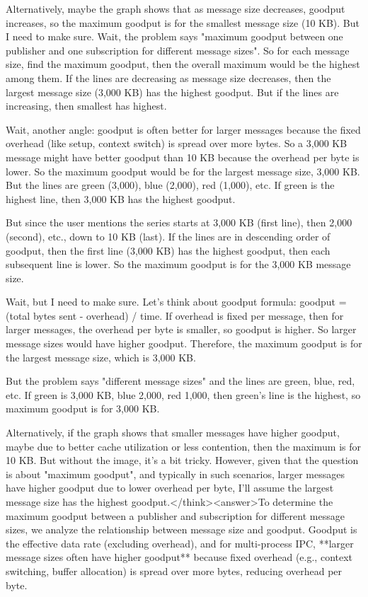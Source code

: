 Alternatively, maybe the graph shows that as message size decreases, goodput increases, so the maximum goodput is for the smallest message size (10 KB). But I need to make sure. Wait, the problem says "maximum goodput between one publisher and one subscription for different message sizes". So for each message size, find the maximum goodput, then the overall maximum would be the highest among them. If the lines are decreasing as message size decreases, then the largest message size (3,000 KB) has the highest goodput. But if the lines are increasing, then smallest has highest. 

Wait, another angle: goodput is often better for larger messages because the fixed overhead (like setup, context switch) is spread over more bytes. So a 3,000 KB message might have better goodput than 10 KB because the overhead per byte is lower. So the maximum goodput would be for the largest message size, 3,000 KB. But the lines are green (3,000), blue (2,000), red (1,000), etc. If green is the highest line, then 3,000 KB has the highest goodput. 

But since the user mentions the series starts at 3,000 KB (first line), then 2,000 (second), etc., down to 10 KB (last). If the lines are in descending order of goodput, then the first line (3,000 KB) has the highest goodput, then each subsequent line is lower. So the maximum goodput is for the 3,000 KB message size. 

Wait, but I need to make sure. Let's think about goodput formula: goodput = (total bytes sent - overhead) / time. If overhead is fixed per message, then for larger messages, the overhead per byte is smaller, so goodput is higher. So larger message sizes would have higher goodput. Therefore, the maximum goodput is for the largest message size, which is 3,000 KB. 

But the problem says "different message sizes" and the lines are green, blue, red, etc. If green is 3,000 KB, blue 2,000, red 1,000, then green's line is the highest, so maximum goodput is for 3,000 KB. 

Alternatively, if the graph shows that smaller messages have higher goodput, maybe due to better cache utilization or less contention, then the maximum is for 10 KB. But without the image, it's a bit tricky. However, given that the question is about "maximum goodput", and typically in such scenarios, larger messages have higher goodput due to lower overhead per byte, I'll assume the largest message size has the highest goodput.</think><answer>To determine the maximum goodput between a publisher and subscription for different message sizes, we analyze the relationship between message size and goodput. Goodput is the effective data rate (excluding overhead), and for multi-process IPC, **larger message sizes often have higher goodput** because fixed overhead (e.g., context switching, buffer allocation) is spread over more bytes, reducing overhead per byte.  

